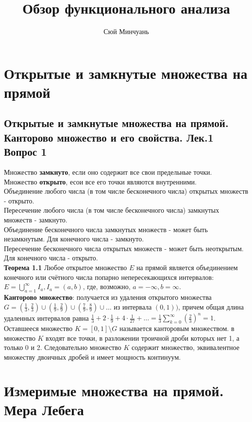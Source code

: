 \documentclass{article}
\begin{document}
\author{Сюй Минчуань}
\title{Обзор функционального анализа}
\maketitle
\tableofcontents
\newpage
\section{Открытые и замкнутые множества на прямой}
\subsection{Открытые и замкнутые множества на прямой. Канторово множество и его свойства. Лек.1 \textbf{Вопрос 1}}
	Множество \textbf{замкнуто}, если оно содержит все свои предельные точки.\\
	Множество \textbf{открыто}, есои все его точки являются внутренними.\\
	Объединение любого числа (в том числе бесконечного числа) открытых множеств - открыто.\\
	Пересечение любого числа (в том числе бесконечного числа) замкнутых множеств - замкнуто.\\
	Объединение бесконечного числа замкнутых множеств - может быть незамкнутым. Для конечного числа - замкнуто.\\
	Пересечение бесконечного числа открытых множеств - может быть неоткрытым. Для конечного числа - открыто.\\
	
	\textbf{Теорема 1.1} Любое открытое множество $E$ на прямой является объединением конечного
	или счётного числа попарно непересекающихся интервалов: $E=\bigcup_{a=1}^{\infty} I_{a}, I_{a}=(a, b)$, где, возможно, $a=-\infty, b=\infty$.\\
	
	\textbf{Канторово множество}: получается из удаления открытого множества $G=\left(\frac{1}{3}, \frac{2}{3}\right) \cup\left(\frac{1}{9}, \frac{2}{9}\right) \cup\left(\frac{7}{9}, \frac{8}{9}\right) \cup \ldots$ из интервала $(0,1))$, причем общая длина удаленных интервалов равна
	$\frac{1}{3}+2 \cdot \frac{1}{9}+4 \cdot \frac{1}{27}+\ldots=\frac{1}{3} \sum_{k=0}^{\infty}\left(\frac{2}{3}\right)^{n}=1$. Оставшееся множество  $K=[0,1] \setminus G$ называется канторовым множеством.
	в множество $K$ входят все точки, в разложении троичной дроби которых нет 1, а только 0 и 2. Следовательно множество $K$ содержит множество, эквивалентное множеству двоичных дробей и имеет мощность континуум.
\section{Измеримые множества на прямой. Мера Лебега}
\end{document}
